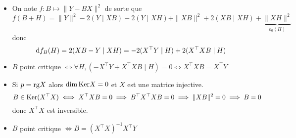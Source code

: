 \begin{itemize}
    \item On note $f:B\longmapsto \|Y-BX\|^2$ de sorte que \[
            f(B+H)=\|Y\|^2-2(Y\;|\;XB)-2(Y\;|\;XH)+\|XB\|^2+2(XB\;|\;XH)+\underbrace{\|XH\|^2}_{o_0(H)}
        \]
        donc \[
            \mathrm{d} f_B(H)=2(XB-Y\;|\;XH)=-2(X^\top Y\;|\; H)+2(X^\top XB\;|\;H)
        \]
    \item $B$ point critique $\iff \forall H, (-X^\top Y+X^\top XB\;|\;H)=0 \iff X^\top XB=X^\top Y$
    \item Si $p=\mathrm{rg} X$ alors $\dim\mathrm{Ker} X=0$ et $X$ est une matrice injective. \[
            B\in \mathrm{Ker}(X^\top X)\iff X^\top XB=0\implies B^\top X^\top XB=0\implies \|XB\|^2=0\implies B=0
        \]
        donc $X^\top X$ est inversible.
    \item $B$ point critique $\iff B=(X^\top X)^{-1}X^\top Y$
\end{itemize}

